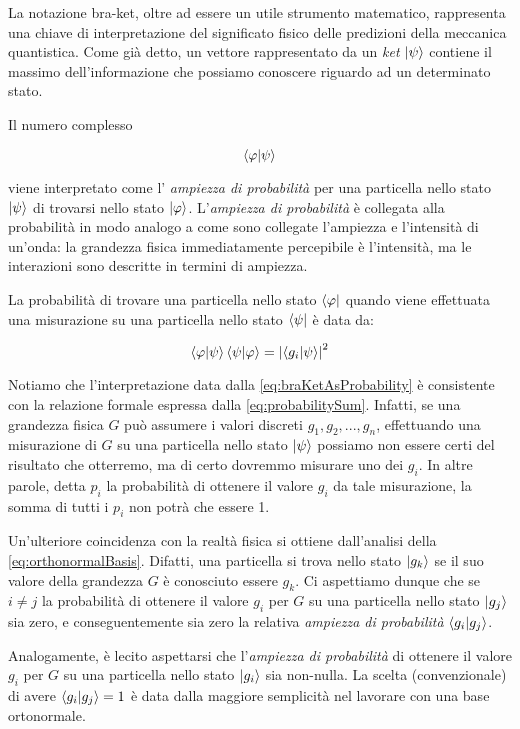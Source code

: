 La notazione bra-ket, oltre ad essere un utile strumento matematico, rappresenta una chiave di interpretazione del significato fisico delle predizioni della meccanica quantistica. Come già detto, un vettore rappresentato da un \textit{ket} $\ket{\psi}$ contiene il massimo dell'informazione che possiamo conoscere riguardo ad un determinato stato. 

Il numero complesso 

	\[
		\braket{\varphi}{\psi}
	\]

viene interpretato come l' \textit{ampiezza di probabilità} per una particella nello stato $\ket{\psi}$ di trovarsi nello stato $\ket{\varphi}$. L'\textit{ampiezza di probabilità} è collegata alla probabilità in modo analogo a come sono collegate l'ampiezza e l'intensità di un'onda: la grandezza fisica immediatamente percepibile è l'intensità, ma le interazioni sono descritte in termini di ampiezza.

La probabilità di trovare una particella nello stato $\bra{\varphi}$ quando viene effettuata una misurazione su una particella nello stato $\bra{\psi}$ è data da:

	\begin{equation} \label{eq:braKetAsProbability}
		\braket{\varphi}{\psi} \braket{\psi}{\varphi} = \left | \braket{g_i}{\psi} \right |^2
	\end{equation}

Notiamo che l'interpretazione data dalla \eqref{eq:braKetAsProbability} è consistente con la relazione formale espressa dalla \eqref{eq:probabilitySum}. Infatti, se una grandezza fisica $G$ può assumere i valori discreti $g_1, g_2, ..., g_n$, effettuando una misurazione di $G$ su una particella nello stato $\ket{\psi}$ possiamo non essere certi del risultato che otterremo, ma di certo dovremmo misurare uno dei $g_i$. In altre parole, detta $p_i$ la probabilità di ottenere il valore $g_i$ da tale misurazione, la somma di tutti i $p_i$ non potrà che essere 1.

Un'ulteriore coincidenza con la realtà fisica si ottiene dall'analisi della \eqref{eq:orthonormalBasis}. Difatti, una particella si trova nello stato $\ket{g_k}$ se il suo valore della grandezza $G$ è conosciuto essere $g_k$. Ci aspettiamo dunque che se $i \neq j$ la probabilità di ottenere il valore $g_i$ per $G$ su una particella nello stato $\ket{g_j}$ sia zero, e conseguentemente sia zero la relativa \textit{ampiezza di probabilità} $\braket{g_i}{g_j}$.

Analogamente, è lecito aspettarsi che l'\textit{ampiezza di probabilità} di ottenere il valore $g_i$ per $G$ su una particella nello stato $\ket{g_i}$ sia non-nulla. La scelta (convenzionale) di avere $\braket{g_i}{g_j} = 1$ è data dalla maggiore semplicità nel lavorare con una base ortonormale.

